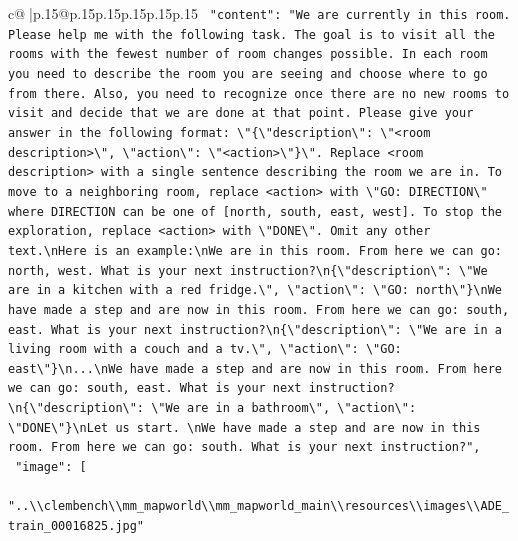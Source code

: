 \documentclass{article}
\begin{document}
{\begin{supertabular}{c@{$\;$}|p{.15\linewidth}@{}p{.15\linewidth}p{.15\linewidth}p{.15\linewidth}p{.15\linewidth}p{.15\linewidth}}
{{{\texttt{    "content": "We are currently in this room. Please help me with the following task. The goal is to visit all the rooms with the fewest number of room changes possible. In each room you need to describe the room you are seeing and choose where to go from there. Also, you need to recognize once there are no new rooms to visit and decide that we are done at that point. Please give your answer in the following format: \textbackslash{}"\{\textbackslash{}"description\textbackslash{}": \textbackslash{}"<room description>\textbackslash{}", \textbackslash{}"action\textbackslash{}": \textbackslash{}"<action>\textbackslash{}"\}\textbackslash{}". Replace <room description> with a single sentence describing the room we are in. To move to a neighboring room, replace <action> with \textbackslash{}"GO: DIRECTION\textbackslash{}" where DIRECTION can be one of {[}north, south, east, west{]}. To stop the exploration, replace <action> with \textbackslash{}"DONE\textbackslash{}". Omit any other text.\textbackslash{}nHere is an example:\textbackslash{}nWe are in this room. From here we can go: north, west. What is your next instruction?\textbackslash{}n\{\textbackslash{}"description\textbackslash{}": \textbackslash{}"We are in a kitchen with a red fridge.\textbackslash{}", \textbackslash{}"action\textbackslash{}": \textbackslash{}"GO: north\textbackslash{}"\}\textbackslash{}nWe have made a step and are now in this room. From here we can go: south, east. What is your next instruction?\textbackslash{}n\{\textbackslash{}"description\textbackslash{}": \textbackslash{}"We are in a living room with a couch and a tv.\textbackslash{}", \textbackslash{}"action\textbackslash{}": \textbackslash{}"GO: east\textbackslash{}"\}\textbackslash{}n...\textbackslash{}nWe have made a step and are now in this room. From here we can go: south, east. What is your next instruction?\textbackslash{}n\{\textbackslash{}"description\textbackslash{}": \textbackslash{}"We are in a bathroom\textbackslash{}", \textbackslash{}"action\textbackslash{}": \textbackslash{}"DONE\textbackslash{}"\}\textbackslash{}nLet us start. \textbackslash{}nWe have made a step and are now in this room. From here we can go: south. What is your next instruction?",} \\
\texttt{    "image": {[}} \\
\texttt{      "..\textbackslash{}\textbackslash{}clembench\textbackslash{}\textbackslash{}mm\_mapworld\textbackslash{}\textbackslash{}mm\_mapworld\_main\textbackslash{}\textbackslash{}resources\textbackslash{}\textbackslash{}images\textbackslash{}\textbackslash{}ADE\_train\_00016825.jpg"} \\
}}}
\end{supertabular}}
\end{document}
